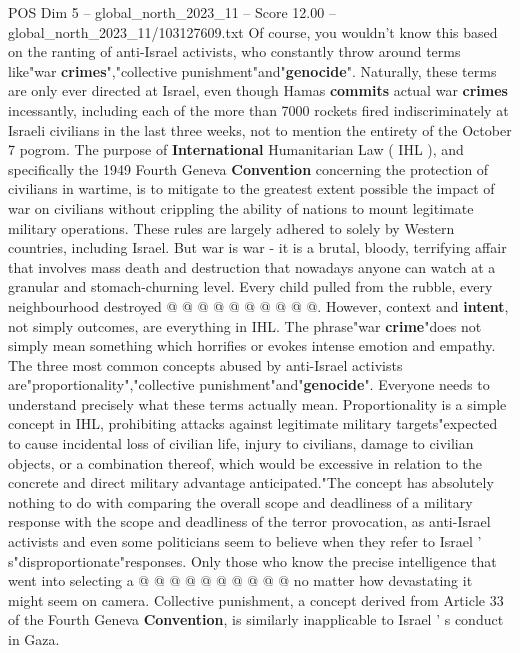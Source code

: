 \begin{textsample}{POS Dim 5 – global\_north\_2023\_11 – Score 12.00 – global\_north\_2023\_11/103127609.txt}  \label{ex:f5_pos_420}
Of course, you wouldn't know this based on the ranting of anti-Israel activists, who constantly throw around terms like"war \textbf{crimes}","collective punishment"and"\textbf{genocide}".
Naturally, these terms are only ever directed at Israel, even though Hamas \textbf{commits} actual war \textbf{crimes} incessantly, including each of the more than 7000 rockets fired indiscriminately at Israeli civilians in the last three weeks, not to mention the entirety of the October 7 pogrom.
The purpose of \textbf{International} Humanitarian Law ( IHL ), and specifically the 1949 Fourth Geneva \textbf{Convention} concerning the protection of civilians in wartime, is to mitigate to the greatest extent possible the impact of war on civilians without crippling the ability of nations to mount legitimate military operations.
These rules are largely adhered to solely by Western countries, including Israel.
But war is war - it is a brutal, bloody, terrifying affair that involves mass death and destruction that nowadays anyone can watch at a granular and stomach-churning level.
Every child pulled from the rubble, every neighbourhood destroyed @ @ @ @ @ @ @ @ @ @.
However, context and \textbf{intent}, not simply outcomes, are everything in IHL.
The phrase"war \textbf{crime}"does not simply mean something which horrifies or evokes intense emotion and empathy.
The three most common concepts abused by anti-Israel activists are"proportionality","collective punishment"and"\textbf{genocide}".
Everyone needs to understand precisely what these terms actually mean.
Proportionality is a simple concept in IHL, prohibiting attacks against legitimate military targets"expected to cause incidental loss of civilian life, injury to civilians, damage to civilian objects, or a combination thereof, which would be excessive in relation to the concrete and direct military advantage anticipated."The concept has absolutely nothing to do with comparing the overall scope and deadliness of a military response with the scope and deadliness of the terror provocation, as anti-Israel activists and even some politicians seem to believe when they refer to Israel ' s"disproportionate"responses.
Only those who know the precise intelligence that went into selecting a @ @ @ @ @ @ @ @ @ @ no matter how devastating it might seem on camera.
Collective punishment, a concept derived from Article 33 of the Fourth Geneva \textbf{Convention}, is similarly inapplicable to Israel ' s conduct in Gaza.

\end{textsample}
